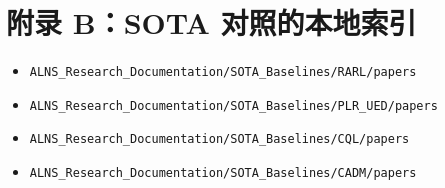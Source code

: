 \documentclass[UTF8,11pt,a4paper]{ctexart}
\begin{document}
\section*{附录 B：SOTA 对照的本地索引}
\begin{itemize}
\item \texttt{ALNS\_Research\_Documentation/SOTA\_Baselines/RARL/papers}
\item \texttt{ALNS\_Research\_Documentation/SOTA\_Baselines/PLR\_UED/papers}
\item \texttt{ALNS\_Research\_Documentation/SOTA\_Baselines/CQL/papers}
\item \texttt{ALNS\_Research\_Documentation/SOTA\_Baselines/CADM/papers}
\end{itemize}
\end{document}
